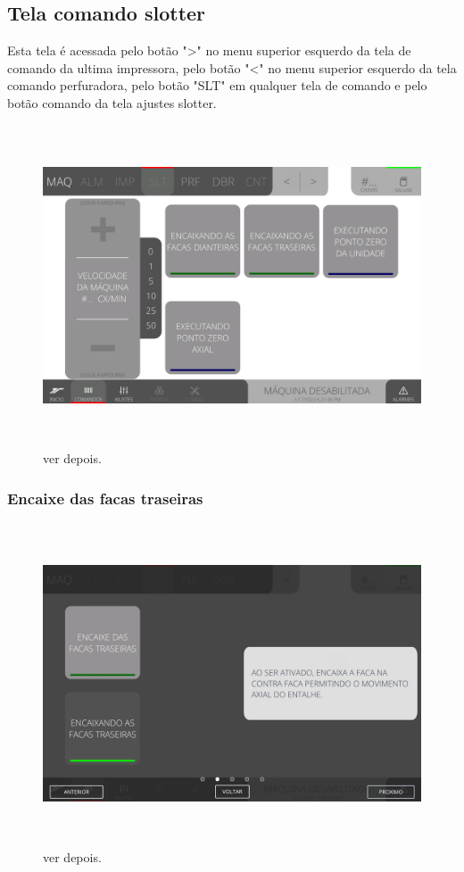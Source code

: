 \thispagestyle{fancy}
\vspace*{\fill}
\subsection{Tela comando slotter}
 Esta tela é acessada pelo botão "\textgreater" no menu superior esquerdo da tela de comando da ultima impressora, pelo botão "\textless{}" no menu superior esquerdo da tela comando perfuradora, pelo botão "SLT" em qualquer tela de comando e pelo botão comando da tela ajustes slotter.
\begin{figure}[h]
  \centering
  \includegraphics[width=576px,height=360px]{src/imagesFlexo/05-slotter/commands/e-Tela-Principal.png}
  \caption{ver depois.}
   \label{}
\end{figure}

\newpage
\thispagestyle{fancy}
\vspace*{\fill}
\subsubsection{\small{Encaixe das facas traseiras}}
\begin{figure}[h]
  \centering
  \includegraphics[width=576px,height=360px]{src/imagesFlexo/05-slotter/commands/e-2.png}
  \caption{ver depois.}
   \label{}
\end{figure}
\vspace*{\fill}

